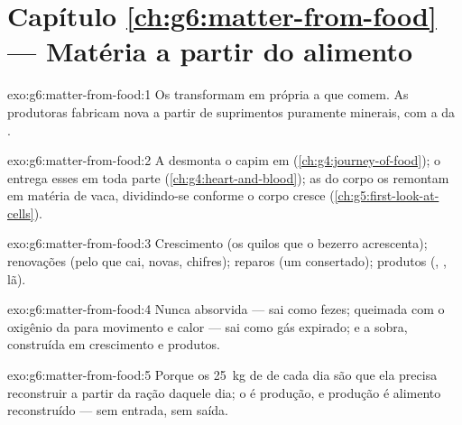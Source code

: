 \section*{Capítulo \ref{ch:g6:matter-from-food} --- Matéria a partir do alimento}

\begin{solution}{exo:g6:matter-from-food:1}
Os  transformam em  própria a  que comem. As produtoras fabricam  nova a
partir de suprimentos puramente minerais, com a  da .
\end{solution}

\begin{solution}{exo:g6:matter-from-food:2}
A  desmonta o capim em 
(\cref{ch:g4:journey-of-food}); o  entrega esses  em
toda parte (\cref{ch:g4:heart-and-blood}); as  do corpo os
remontam em matéria de vaca, dividindo-se conforme o corpo cresce
(\cref{ch:g5:first-look-at-cells}).
\end{solution}

\begin{solution}{exo:g6:matter-from-food:3}
Crescimento (os quilos que o bezerro acrescenta); renovações (pelo
que cai,  novas, chifres); reparos (um  consertado); produtos
(, , lã).
\end{solution}

\begin{solution}{exo:g6:matter-from-food:4}
Nunca absorvida --- sai como fezes; queimada com o oxigênio da
 para movimento e calor --- sai como gás expirado; e a
sobra, construída em crescimento e produtos.
\end{solution}

\begin{solution}{exo:g6:matter-from-food:5}
Porque os \qty{25}{kg} de  de cada dia são  que
ela precisa reconstruir a partir da ração daquele dia; o  é
produção, e produção é alimento reconstruído --- sem entrada, sem
saída.
\end{solution}

